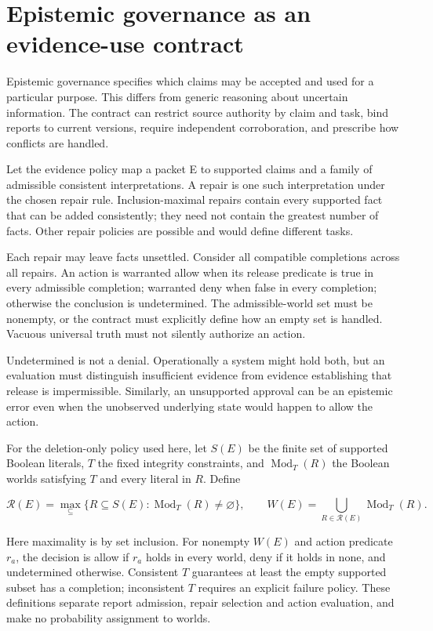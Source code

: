 \documentclass[a4paper,preprint,12pt,numbers,nopreprintline]{elsarticle}
\begin{document}
\section{Epistemic governance as an evidence-use contract}

Epistemic governance specifies which claims may be accepted and used for a particular purpose. This differs from generic reasoning about uncertain information. The contract can restrict source authority by claim and task, bind reports to current versions, require independent corroboration, and prescribe how conflicts are handled.

Let the evidence policy map a packet E to supported claims and a family of admissible consistent interpretations. A repair is one such interpretation under the chosen repair rule. Inclusion-maximal repairs contain every supported fact that can be added consistently; they need not contain the greatest number of facts. Other repair policies are possible and would define different tasks.

Each repair may leave facts unsettled. Consider all compatible completions across all repairs. An action is warranted allow when its release predicate is true in every admissible completion; warranted deny when false in every completion; otherwise the conclusion is undetermined. The admissible-world set must be nonempty, or the contract must explicitly define how an empty set is handled. Vacuous universal truth must not silently authorize an action.



Undetermined is not a denial. Operationally a system might hold both, but an evaluation must distinguish insufficient evidence from evidence establishing that release is impermissible. Similarly, an unsupported approval can be an epistemic error even when the unobserved underlying state would happen to allow the action.

For the deletion-only policy used here, let \(S(E)\) be the finite set of supported Boolean literals, \(T\) the fixed integrity constraints, and \(\operatorname{Mod}_T(R)\) the Boolean worlds satisfying \(T\) and every literal in \(R\). Define

\[
\mathcal R(E)=\max_{\subseteq}\{R\subseteq S(E):\operatorname{Mod}_T(R)\ne\varnothing\},
\qquad
W(E)=\bigcup_{R\in\mathcal R(E)}\operatorname{Mod}_T(R).
\]

Here maximality is by set inclusion. For nonempty \(W(E)\) and action predicate \(r_a\), the decision is allow if \(r_a\) holds in every world, deny if it holds in none, and undetermined otherwise. Consistent \(T\) guarantees at least the empty supported subset has a completion; inconsistent \(T\) requires an explicit failure policy. These definitions separate report admission, repair selection and action evaluation, and make no probability assignment to worlds.
\end{document}
